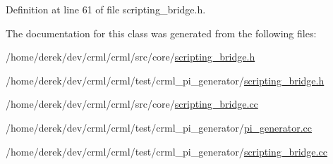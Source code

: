 Definition at line 61 of file scripting\_\-bridge.h.



The documentation for this class was generated from the following files:\begin{DoxyCompactItemize}
\item 
/home/derek/dev/crml/crml/src/core/\hyperlink{src_2core_2scripting__bridge_8h}{scripting\_\-bridge.h}\item 
/home/derek/dev/crml/crml/test/crml\_\-pi\_\-generator/\hyperlink{test_2crml__pi__generator_2scripting__bridge_8h}{scripting\_\-bridge.h}\item 
/home/derek/dev/crml/crml/src/core/\hyperlink{src_2core_2scripting__bridge_8cc}{scripting\_\-bridge.cc}\item 
/home/derek/dev/crml/crml/test/crml\_\-pi\_\-generator/\hyperlink{crml__pi__generator_2pi__generator_8cc}{pi\_\-generator.cc}\item 
/home/derek/dev/crml/crml/test/crml\_\-pi\_\-generator/\hyperlink{test_2crml__pi__generator_2scripting__bridge_8cc}{scripting\_\-bridge.cc}\end{DoxyCompactItemize}
